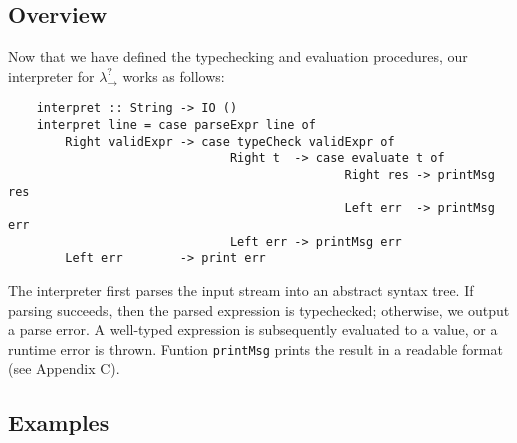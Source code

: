 \subsection{Overview}
Now that we have defined the typechecking and evaluation procedures, 
our interpreter for $\lambda ^? _{\rightarrow}$ works as follows:
\begin{lstlisting}
    interpret :: String -> IO ()
    interpret line = case parseExpr line of 
        Right validExpr -> case typeCheck validExpr of 
                               Right t  -> case evaluate t of 
                                               Right res -> printMsg res
                                               Left err  -> printMsg err
                               Left err -> printMsg err
        Left err        -> print err   
\end{lstlisting}
The interpreter first parses the input stream into an abstract syntax tree. 
If parsing succeeds, then the parsed expression is typechecked; 
otherwise, we output a parse error. A well-typed expression is subsequently 
evaluated to a value, or a runtime error is thrown. Funtion \lstinline{printMsg} 
prints the result in a readable format (see Appendix C).

\subsection{Examples}




